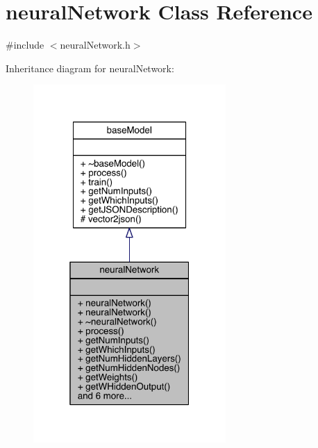 \hypertarget{classneural_network}{}\section{neural\+Network Class Reference}
\label{classneural_network}


{\ttfamily \#include $<$neural\+Network.\+h$>$}



Inheritance diagram for neural\+Network\+:
\nopagebreak
\begin{figure}[H]
\begin{center}
\leavevmode
\includegraphics[width=208pt]{classneural_network__inherit__graph}
\end{center}
\end{figure}


